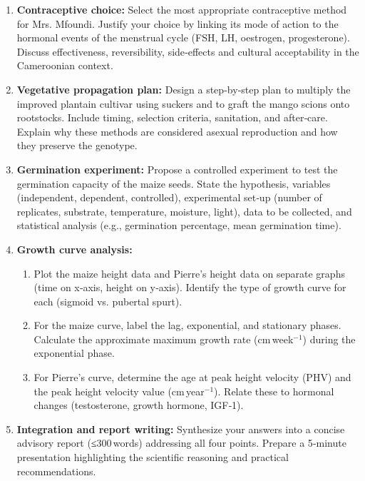 \documentclass[11pt]{article}
\newcounter{popsec}
\newcounter{popsub}
\newcommand{\courssub}[1]{%
  \stepcounter{popsub}%
  \par\vspace{9pt}\noindent{\popxbold\fontsize{11.5}{13}\selectfont\color{popink}{\color{poporange}\thepopsec.\thepopsub}\hspace{6pt}#1}\par\nopagebreak\vspace{4pt}
}
\begin{document}
\courssub{Tasks}
\begin{enumerate}
    \item \textbf{Contraceptive choice:} Select the most appropriate contraceptive method for Mrs. Mfoundi. Justify your choice by linking its mode of action to the hormonal events of the menstrual cycle (FSH, LH, oestrogen, progesterone). Discuss effectiveness, reversibility, side‑effects and cultural acceptability in the Cameroonian context.
    \item \textbf{Vegetative propagation plan:} Design a step‑by‑step plan to multiply the improved plantain cultivar using suckers and to graft the mango scions onto rootstocks. Include timing, selection criteria, sanitation, and after‑care. Explain why these methods are considered asexual reproduction and how they preserve the genotype.
    \item \textbf{Germination experiment:} Propose a controlled experiment to test the germination capacity of the maize seeds. State the hypothesis, variables (independent, dependent, controlled), experimental set‑up (number of replicates, substrate, temperature, moisture, light), data to be collected, and statistical analysis (e.g., germination percentage, mean germination time).
    \item \textbf{Growth curve analysis:}
    \begin{enumerate}
        \item Plot the maize height data and Pierre’s height data on separate graphs (time on x‑axis, height on y‑axis). Identify the type of growth curve for each (sigmoid vs. pubertal spurt).
        \item For the maize curve, label the lag, exponential, and stationary phases. Calculate the approximate maximum growth rate (cm week\(^{-1}\)) during the exponential phase.
        \item For Pierre’s curve, determine the age at peak height velocity (PHV) and the peak height velocity value (cm year\(^{-1}\)). Relate these to hormonal changes (testosterone, growth hormone, IGF‑1).
    \end{enumerate}
    \item \textbf{Integration and report writing:} Synthesize your answers into a concise advisory report (≤300 words) addressing all four points. Prepare a 5‑minute presentation highlighting the scientific reasoning and practical recommendations.
\end{enumerate}

\courssub{Model Answers}
\end{document}
